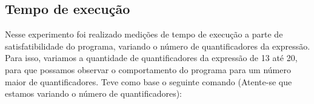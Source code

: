 \documentclass{article}
\begin{document}



\subsection{Tempo de execução}

Nesse experimento foi realizado medições de tempo de execução a parte de satisfatibilidade do programa, variando o número de quantificadores da expressão. Para isso,
variamos a quantidade de quantificadores da expressão de 13 até 20, para que possamos observar o comportamento do programa para um número maior de quantificadores.
Teve como base o seguinte comando (Atente-se que estamos variando o número de quantificadores): 
\end{document}
